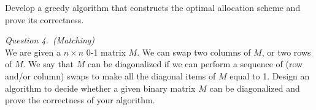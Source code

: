 \documentclass[11pt]{article}
\begin{document}
Develop a greedy algorithm that constructs the optimal allocation scheme
and prove its correctness.

\bigskip\rm\noindent
\emph{Question 4.~(Matching)}\\
We are given a $n\times n$ 0-1 matrix $M$.  We can swap two columns of $M$, or
two rows of $M$.  We say that $M$ can be diagonalized if we can perform a
sequence of (row and/or column) swaps to make all the diagonal items of $M$
equal to 1.  Design an algorithm to decide whether a given binary matrix $M$
can be diagonalized and prove the correctness of your algorithm.
\end{document}

